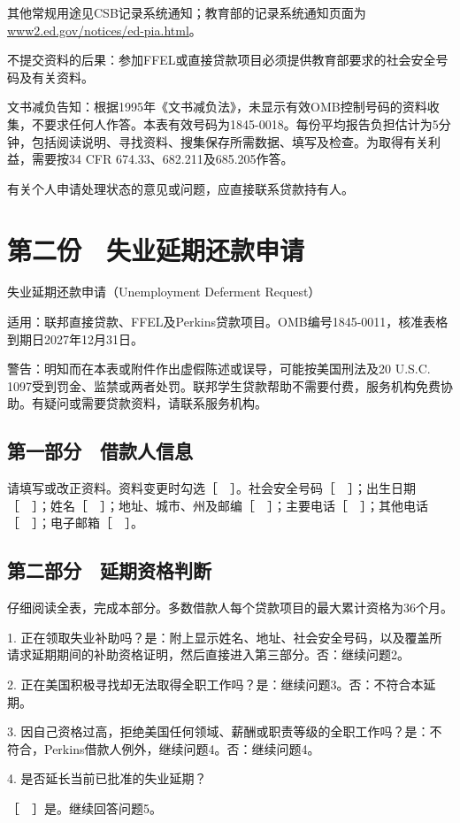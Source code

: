 \documentclass[UTF8,fontset=none,11pt,a4paper]{ctexart}
\begin{document}
其他常规用途见CSB记录系统通知；教育部的记录系统通知页面为\url{www2.ed.gov/notices/ed-pia.html}。


不提交资料的后果：参加FFEL或直接贷款项目必须提供教育部要求的社会安全号码及有关资料。


文书减负告知：根据1995年《文书减负法》，未显示有效OMB控制号码的资料收集，不要求任何人作答。本表有效号码为1845-0018。每份平均报告负担估计为5分钟，包括阅读说明、寻找资料、搜集保存所需数据、填写及检查。为取得有关利益，需要按34 CFR 674.33、682.211及685.205作答。


有关个人申请处理状态的意见或问题，应直接联系贷款持有人。


\section*{第二份　失业延期还款申请}
失业延期还款申请（Unemployment Deferment Request）


适用：联邦直接贷款、FFEL及Perkins贷款项目。OMB编号1845-0011，核准表格到期日2027年12月31日。


警告：明知而在本表或附件作出虚假陈述或误导，可能按美国刑法及20 U.S.C. 1097受到罚金、监禁或两者处罚。联邦学生贷款帮助不需要付费，服务机构免费协助。有疑问或需要贷款资料，请联系服务机构。


\subsection*{第一部分　借款人信息}
请填写或改正资料。资料变更时勾选［　］。社会安全号码［　］；出生日期［　］；姓名［　］；地址、城市、州及邮编［　］；主要电话［　］；其他电话［　］；电子邮箱［　］。


\subsection*{第二部分　延期资格判断}
仔细阅读全表，完成本部分。多数借款人每个贷款项目的最大累计资格为36个月。


1. 正在领取失业补助吗？是：附上显示姓名、地址、社会安全号码，以及覆盖所请求延期期间的补助资格证明，然后直接进入第三部分。否：继续问题2。


2. 正在美国积极寻找却无法取得全职工作吗？是：继续问题3。否：不符合本延期。


3. 因自己资格过高，拒绝美国任何领域、薪酬或职责等级的全职工作吗？是：不符合，Perkins借款人例外，继续问题4。否：继续问题4。


4. 是否延长当前已批准的失业延期？


［　］是。继续回答问题5。
\end{document}

